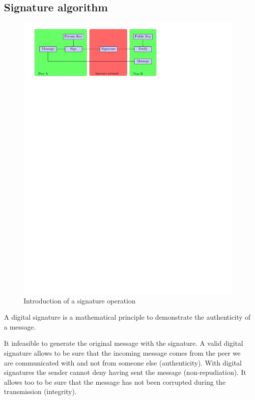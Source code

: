 
\newpage

\subsection{Signature algorithm}
\label{intro_sign}
\begin{figure}[!ht]
\centering
\includegraphics[trim=2cm 22.25cm 7.5cm 0cm]{figures/signature.pdf}
\caption{Introduction of a signature operation\newline}
\label{fig:sign}
\end{figure}
A digital signature is a mathematical principle to demonstrate the authenticity of
a message.\newline

It infeasible to generate the original message with the signature.
A valid digital signature allows to be sure that the incoming message comes from
the peer we are communicated with and not from someone else
(authenticity).\newline
With digital signatures the sender cannot deny having sent the message
(non-repudiation).\newline
It allows too to be sure that the message has not been corrupted during the
transmission (integrity).\newline


